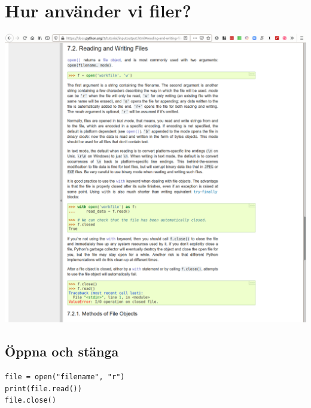 \section{Hur använder vi filer?}

\begin{frame}
  \includegraphics[width=\columnwidth]{figs/docs-files.png}
\end{frame}

\subsection{Öppna och stänga}

\begin{frame}[fragile]
  \begin{lstlisting}[numbers=none,basicstyle=\Large]
file = open("filename", "r")
print(file.read())
file.close()
  \end{lstlisting}
\end{frame}

\begin{frame}[fragile]
  \begin{example}
    
  \end{example}
\end{frame}

